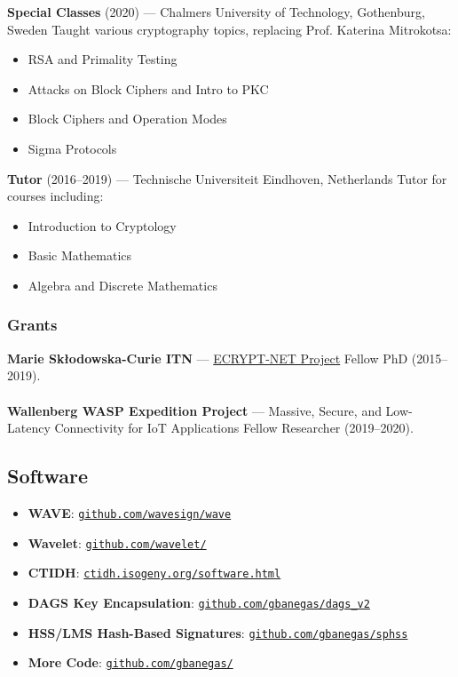 \textbf{Special Classes} (2020) — Chalmers University of Technology, Gothenburg, Sweden  
Taught various cryptography topics, replacing Prof. Katerina Mitrokotsa:  
\begin{itemize}
\item RSA and Primality Testing  
\item Attacks on Block Ciphers and Intro to PKC  
\item Block Ciphers and Operation Modes  
\item Sigma Protocols  
\end{itemize}

\textbf{Tutor} (2016--2019) — Technische Universiteit Eindhoven, Netherlands  
Tutor for courses including:  
\begin{itemize}
\item Introduction to Cryptology  
\item Basic Mathematics  
\item Algebra and Discrete Mathematics  
\end{itemize}

\subsubsection*{Grants}
\textbf{Marie Skłodowska-Curie ITN} — \href{https://www.ecrypt.eu.org/net/}{ECRYPT-NET Project}  
Fellow PhD (2015–2019).  
~\\ \\
\textbf{Wallenberg WASP Expedition Project} — Massive, Secure, and Low-Latency Connectivity for IoT Applications  
Fellow Researcher (2019–2020).  


\subsection*{Software}

\small
\begin{itemize}
\setlength{\itemsep}{1pt}
    \item \textbf{WAVE}: \href{https://github.com/wavesign/wave}{\texttt{github.com/wavesign/wave}}
    \item \textbf{Wavelet}: \href{https://github.com/wavelet/}{\texttt{github.com/wavelet/}}
    \item \textbf{CTIDH}: \href{http://ctidh.isogeny.org/software.html}{\texttt{ctidh.isogeny.org/software.html}}
    \item \textbf{DAGS Key Encapsulation}: \href{https://github.com/gbanegas/dags_v2}{\texttt{github.com/gbanegas/dags\_v2}}
    \item \textbf{HSS/LMS Hash-Based Signatures}: \href{https://github.com/gbanegas/sphss}{\texttt{github.com/gbanegas/sphss}}
    \item \textbf{More Code}: \href{https://github.com/gbanegas/}{\texttt{github.com/gbanegas/}}
\end{itemize}


